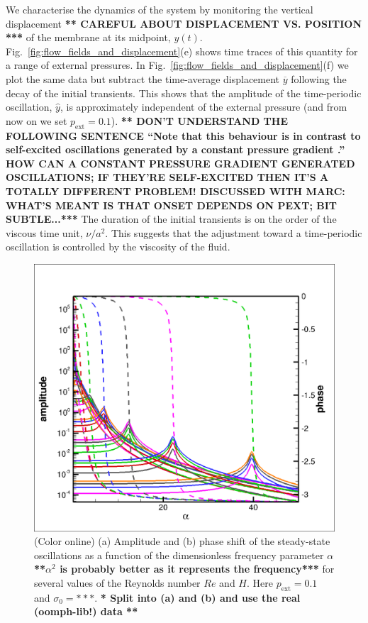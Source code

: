 \documentclass[aps,prl,reprint,superscriptaddress,floatfix]{revtex4-1}
\begin{document}
We characterise the dynamics of the system by monitoring the vertical
displacement {\bf *** CAREFUL ABOUT DISPLACEMENT VS. POSITION ***}
of the membrane at its midpoint, $y(t)$. 
Fig.~\ref{fig:flow_fields_and_displacement}(e) shows time traces of this 
quantity for a range of external pressures. In
Fig.~\ref{fig:flow_fields_and_displacement}(f) we plot
the same data but subtract the time-average displacement
$\overline{y}$ following the decay of the initial transients. This shows
that the amplitude of the time-periodic oscillation, $\widehat{y}$,
is approximately independent of the external pressure (and from now on we set
$p_\text{ext}=0.1$).
{\bf *** DON'T UNDERSTAND THE FOLLOWING SENTENCE ``Note that this
behaviour is in contrast to self-excited oscillations generated by a
constant pressure gradient \cite{Tang15}.'' HOW CAN A CONSTANT
PRESSURE
GRADIENT GENERATED OSCILLATIONS; IF THEY'RE SELF-EXCITED THEN IT'S
A TOTALLY DIFFERENT PROBLEM! DISCUSSED WITH MARC: WHAT'S MEANT IS THAT
ONSET DEPENDS ON PEXT; BIT SUBTLE...***}
The duration of the initial transients is on the order of the
viscous time unit, $\nu/a^2$. This suggests
that the adjustment toward a time-periodic oscillation is 
controlled by the viscosity of the fluid.

\begin{figure}
\centering
\includegraphics[width=1.0\linewidth]{maple/all_sigma0_times_H.png}	
\caption{\label{fig:amplitude_phase}(Color online) (a) Amplitude and
  (b) phase shift of the steady-state oscillations as a function of
  the dimensionless frequency parameter $\alpha$ {\bf ***$\alpha^2$ is
  probably better as it represents the frequency***} for several
  values of the Reynolds number $Re$ and $H$.
  Here $p_\text{ext}=0.1$ and $\sigma_0=***$.
  {\bf ** Split into (a) and (b) and use the real (oomph-lib!) data **}
}
\end{figure}
\end{document}

